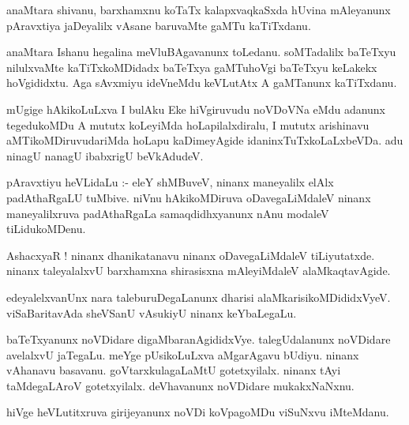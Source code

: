 \documentclass{article}
\begin{document}
\begin{mn}
anaMtara  shivanu,  barxhamxnu  koTaTx  kalapxvaqkaSxda  hUvina  mAleyanunx  pAravxtiya  jaDeyalilx  
vAsane  baruvaMte  gaMTu  kaTiTxdanu.
\end{mn}

\begin{mn}
anaMtara  Ishanu  hegalina  meVluBAgavanunx  toLedanu.  soMTadalilx  baTeTxyu  nilulxvaMte  kaTiTxkoMDidadx  
baTeTxya  gaMTuhoVgi  baTeTxyu  keLakekx  hoVgididxtu.  Aga  sAvxmiyu  ideVneMdu  keVLutAtx  A  gaMTanunx  kaTiTxdanu.
\end{mn}

\begin{mn}
mUgige  hAkikoLuLxva  I  bulAku  Eke  hiVgiruvudu  noVDoVNa  eMdu  adanunx  tegedukoMDu  A  mututx  
koLeyiMda  hoLapilalxdiralu,  I  mututx  arishinavu  aMTikoMDiruvudariMda  hoLapu  kaDimeyAgide  
idaninxTuTxkoLaLxbeVDa.  adu  ninagU  nanagU  ibabxrigU  beVkAdudeV.
\end{mn}

\begin{mn}
pAravxtiyu  heVLidaLu :- eleY  shMBuveV,  ninanx  maneyalilx  elAlx  padAthaRgaLU  tuMbive.  niVnu  hAkikoMDiruva  
oDavegaLiMdaleV  ninanx  maneyalilxruva  padAthaRgaLa  samaqdidhxyanunx  nAnu  modaleV  tiLidukoMDenu.
\end{mn}

\begin{mn}
AshacxyaR !  ninanx  dhanikatanavu  ninanx  oDavegaLiMdaleV  tiLiyutatxde.  ninanx  taleyalalxvU  
barxhamxna  shirasisxna  mAleyiMdaleV  alaMkaqtavAgide.
\end{mn}

\begin{mn}
edeyalelxvanUnx  nara  taleburuDegaLanunx  dharisi  alaMkarisikoMDididxVyeV.  viSaBaritavAda  
sheVSanU  vAsukiyU  ninanx  keYbaLegaLu.
\end{mn}

\begin{mn}
baTeTxyanunx  noVDidare  digaMbaranAgididxVye.  talegUdalanunx  noVDidare  avelalxvU  jaTegaLu.  
meYge  pUsikoLuLxva  aMgarAgavu  bUdiyu.  ninanx  vAhanavu  basavanu.  goVtarxkulagaLaMtU  gotetxyilalx.  
ninanx  tAyi  taMdegaLAroV  gotetxyilalx.  deVhavanunx  noVDidare  mukakxNaNxnu.
\end{mn}

\begin{mn}
hiVge  heVLutitxruva  girijeyanunx  noVDi  koVpagoMDu  viSuNxvu  iMteMdanu.
\end{mn}
\end{document}
